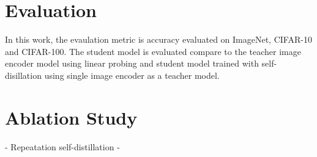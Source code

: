 
\section{Evaluation}
In this work, the evaulation metric is accuracy evaluated on ImageNet, CIFAR-10 and CIFAR-100.
The student model is evaluated compare to the teacher image encoder model using linear probing and student model trained with self-disillation using single image encoder as a teacher model.

\section{Ablation Study}
- Repeatation self-distillation
- 



